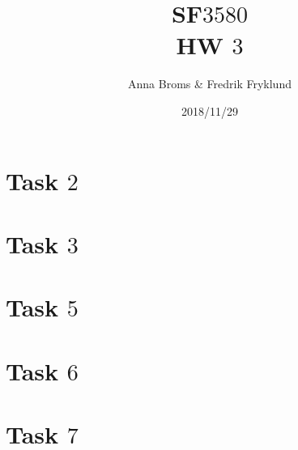 \documentclass[a4paper]{article}
\title{SF$3580$\\HW $3$}
\author{Anna Broms \& Fredrik Fryklund}
\date{2018/11/29}
\begin{document}
\maketitle

 \section*{Task $2$}
 
  \section*{Task $3$}
  
 \section*{Task $5$}
 
 \section*{Task $6$}
 
\section*{Task $7$}

\end{document}

